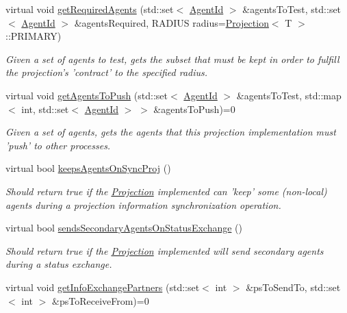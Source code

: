 \begin{DoxyCompactItemize}
\item 
virtual void \hyperlink{classrepast_1_1_grid_ab1ff08ad641de4f74eab53e30ad14eb6}{get\-Required\-Agents} (std\-::set$<$ \hyperlink{classrepast_1_1_agent_id}{Agent\-Id} $>$ \&agents\-To\-Test, std\-::set$<$ \hyperlink{classrepast_1_1_agent_id}{Agent\-Id} $>$ \&agents\-Required, R\-A\-D\-I\-U\-S radius=\hyperlink{classrepast_1_1_projection}{Projection}$<$ T $>$\-::P\-R\-I\-M\-A\-R\-Y)
\begin{DoxyCompactList}\small\item\em Given a set of agents to test, gets the subset that must be kept in order to fulfill the projection's 'contract' to the specified radius. \end{DoxyCompactList}\item 
virtual void \hyperlink{classrepast_1_1_grid_aa83b294fc8765e2f8ee44d8238855460}{get\-Agents\-To\-Push} (std\-::set$<$ \hyperlink{classrepast_1_1_agent_id}{Agent\-Id} $>$ \&agents\-To\-Test, std\-::map$<$ int, std\-::set$<$ \hyperlink{classrepast_1_1_agent_id}{Agent\-Id} $>$ $>$ \&agents\-To\-Push)=0
\begin{DoxyCompactList}\small\item\em Given a set of agents, gets the agents that this projection implementation must 'push' to other processes. \end{DoxyCompactList}\item 
virtual bool \hyperlink{classrepast_1_1_grid_aa46a5e7692430604bb3b04bbb9e2ff50}{keeps\-Agents\-On\-Sync\-Proj} ()
\begin{DoxyCompactList}\small\item\em Should return true if the \hyperlink{classrepast_1_1_projection}{Projection} implemented can 'keep' some (non-\/local) agents during a projection information synchronization operation. \end{DoxyCompactList}\item 
virtual bool \hyperlink{classrepast_1_1_grid_ae3b7e2de573a9212a58a527a9ab519b8}{sends\-Secondary\-Agents\-On\-Status\-Exchange} ()
\begin{DoxyCompactList}\small\item\em Should return true if the \hyperlink{classrepast_1_1_projection}{Projection} implemented will send secondary agents during a status exchange. \end{DoxyCompactList}\item 
virtual void \hyperlink{classrepast_1_1_grid_a57b4449e602392119eb4db3e0011de05}{get\-Info\-Exchange\-Partners} (std\-::set$<$ int $>$ \&ps\-To\-Send\-To, std\-::set$<$ int $>$ \&ps\-To\-Receive\-From)=0

\end{DoxyCompactItemize}
